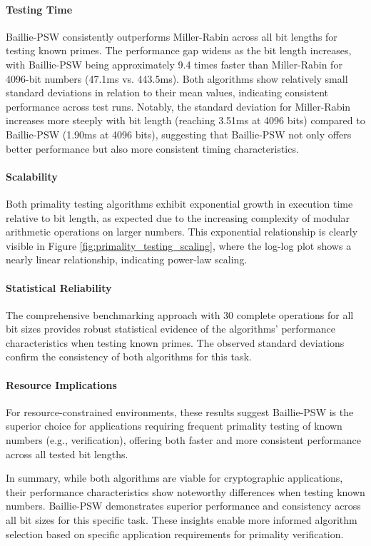 \paragraph{Testing Time}
Baillie-PSW consistently outperforms Miller-Rabin across all bit lengths for testing known primes. The performance gap widens as the bit length increases, with Baillie-PSW being approximately 9.4 times faster than Miller-Rabin for 4096-bit numbers (47.1ms vs. 443.5ms). Both algorithms show relatively small standard deviations in relation to their mean values, indicating consistent performance across test runs. Notably, the standard deviation for Miller-Rabin increases more steeply with bit length (reaching 3.51ms at 4096 bits) compared to Baillie-PSW (1.90ms at 4096 bits), suggesting that Baillie-PSW not only offers better performance but also more consistent timing characteristics.

\paragraph{Scalability}
Both primality testing algorithms exhibit exponential growth in execution time relative to bit length, as expected due to the increasing complexity of modular arithmetic operations on larger numbers. This exponential relationship is clearly visible in Figure \ref{fig:primality_testing_scaling}, where the log-log plot shows a nearly linear relationship, indicating power-law scaling.

\paragraph{Statistical Reliability}
The comprehensive benchmarking approach with 30 complete operations for all bit sizes provides robust statistical evidence of the algorithms' performance characteristics when testing known primes. The observed standard deviations confirm the consistency of both algorithms for this task.

\paragraph{Resource Implications}
For resource-constrained environments, these results suggest Baillie-PSW is the superior choice for applications requiring frequent primality testing of known numbers (e.g., verification), offering both faster and more consistent performance across all tested bit lengths.

In summary, while both algorithms are viable for cryptographic applications, their performance characteristics show noteworthy differences when testing known numbers. Baillie-PSW demonstrates superior performance and consistency across all bit sizes for this specific task. These insights enable more informed algorithm selection based on specific application requirements for primality verification.

